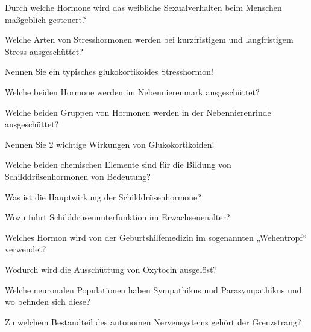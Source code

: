 \documentclass[10pt, a4paper]{exam}
\begin{document}
\begin{questions}
  \begin{solution}
  \end{solution}
  \question Durch welche Hormone wird das weibliche Sexualverhalten beim Menschen maßgeblich gesteuert?
  \begin{solution}
  \end{solution}
  \question Welche Arten von Stresshormonen werden bei kurzfristigem und langfristigem Stress ausgeschüttet?
  \begin{solution}
  \end{solution}
  \question Nennen Sie ein typisches glukokortikoides Stresshormon!
  \begin{solution}
  \end{solution}
  \question Welche beiden Hormone werden im Nebennierenmark ausgeschüttet?
  \begin{solution}
  \end{solution}
  \question Welche beiden Gruppen von Hormonen werden in der Nebennierenrinde ausgeschüttet?
  \begin{solution}
  \end{solution}
  \question Nennen Sie 2 wichtige Wirkungen von Glukokortikoiden!
  \begin{solution}
  \end{solution}
  \question Welche beiden chemischen Elemente sind für die Bildung von Schilddrüsenhormonen von Bedeutung?
  \begin{solution}
  \end{solution}
  \question Was ist die Hauptwirkung der Schilddrüsenhormone?
  \begin{solution}
  \end{solution}
  \question Wozu führt Schilddrüsenunterfunktion im Erwachsenenalter?
  \begin{solution}
  \end{solution}
  \question Welches Hormon wird von der Geburtshilfemedizin im sogenannten „Wehentropf“ verwendet?
  \begin{solution}
  \end{solution}
  \question Wodurch wird die Ausschüttung von Oxytocin ausgelöst?
  \begin{solution}
  \end{solution}
  \question Welche neuronalen Populationen haben Sympathikus und Parasympathikus und wo befinden sich diese?
  \begin{solution}
  \end{solution}
  \question Zu welchem Bestandteil des autonomen Nervensystems gehört der Grenzstrang?

\end{questions}
\end{document}
